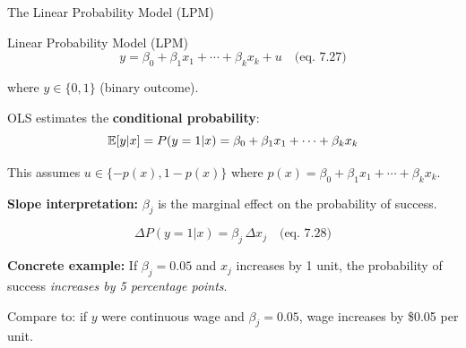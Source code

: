 \documentclass[aspectratio=169, 12pt]{beamer}
\begin{document}
\begin{frame}[shrink=25]{The Linear Probability Model (LPM)}

  \begin{definitionbox}{Linear Probability Model (LPM)}
    \[
      y = \beta_0 + \beta_1 x_1 + \cdots + \beta_k x_k + u \quad \text{(eq.\ 7.27)}
    \]

    where $y \in \{0, 1\}$ (binary outcome).

    OLS estimates the \textbf{conditional probability}:
    \[
      \operatorname{\mathbb{E}}[y | x] = P(y = 1 | x) = \beta_0 + \beta_1 x_1 + \cdots + \beta_k x_k
    \]

    This assumes $u \in \{-p(x), 1-p(x)\}$ where $p(x) = \beta_0 + \beta_1 x_1 + \cdots + \beta_k x_k$.
  \end{definitionbox}

  \medskip

  \textbf{Slope interpretation:} $\beta_j$ is the marginal effect on the probability of success.

  \medskip

  \begin{highlightbox}
    \[
      \Delta P(y=1|x) = \beta_j \, \Delta x_j \quad \text{(eq.\ 7.28)}
    \]

    \textbf{Concrete example:} If $\beta_j = 0.05$ and $x_j$ increases by 1 unit, the probability of success \textit{increases by 5 percentage points}.

    Compare to: if $y$ were continuous wage and $\beta_j = 0.05$, wage increases by \$0.05 per unit.
  \end{highlightbox}

\end{frame}
\end{document}
